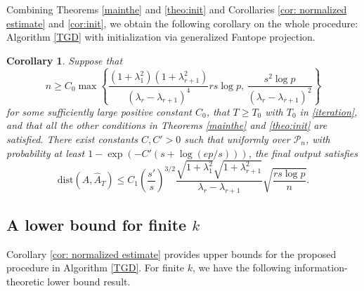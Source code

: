 \documentclass[11pt]{article}
\newcommand{\nb}[1]{\textcolor{orange}{\texttt{[#1]}}}
\newcommand{\norminit}{\widetilde{A}_0} %
\newcommand{\festimate}{\widehat{A}_t}
\newcommand{\0}{{\mathbf{0}}}
\newtheorem{corollary}[theorem]{Corollary}
\begin{document}
Combining Theorems \ref{mainthe} and \ref{theo:init} and Corollaries \ref{cor: normalized estimate} and \ref{cor:init}, 
we obtain the following corollary on the whole procedure: Algorithm \ref{TGD} with initialization via generalized Fantope projection.

\begin{corollary}
      \label{cor: whole procedure}
Suppose that 
\begin{equation}
\label{eq:overall-n-req}
n \geq C_0 
\max\left\{
\frac{(1+\lambda_1^2)(1+\lambda_{r+1}^2)}{(\lambda_r - \lambda_{r+1})^4}
rs\log p,\,
\frac{s^2\log p }{(\lambda_r-\lambda_{r+1})^2}
\right\}
\end{equation}
for some sufficiently large positive constant $C_0$,
that $T \geq T_0$ with $T_0$ in \eqref{iteration},
and that all the other conditions in Theorems \ref{mainthe} and \ref{theo:init} are satisfied.
There exist constants $C,C'>0$ such that 
uniformly over $\mathcal{P}_n$, with probability at least $1-\exp(-C'(s+\log(ep/s)))$,
the final output satisfies
\begin{equation*}
\mathrm{dist}(A,\widehat{A}_T)\leq C_1\left(\frac{s'}{s} \right)^{3/2}\frac{\sqrt{1+\lambda_1^2}\sqrt{{1+\lambda_{r+1}^2}}}{\lambda_r-\lambda_{r+1}}\sqrt{\frac{rs\log p}{n}}.
\end{equation*}
\end{corollary}



\subsection{A lower bound for finite $k$}
\label{sec:lower_bound}
Corollary  \ref{cor: normalized estimate} provides upper bounds for the proposed procedure in Algorithm \ref{TGD}. 
For finite $k$, we have the following information-theoretic lower bound result.
\end{document}
